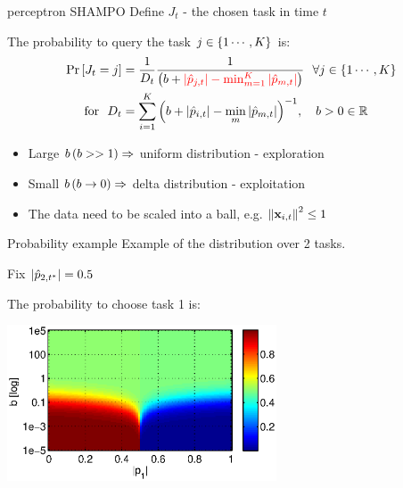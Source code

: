 \documentclass{beamer}
\begin{document}
\begin{frame}{perceptron SHAMPO }
Define $J_t$ - the chosen task in time $t$\newline

The probability to query the task $j\in\left\{{1\cdots,K}\right\}$ is:\newline
\begin{equation*}
\begin{aligned}
 {\rm Pr}\left[{J_t=j}\right]&=\frac{1}{D_t}\frac{1}{\left({b+\textcolor{red}{\left\vert{\hat{p}_{j,t}}\right\vert-\min_{m=1}^K\left\vert{\hat{p}_{m,t}}\right\vert}}\right)} ~~\forall j\in\left\{{1\cdots,K}\right\}\\
~ \textrm{ for }~
D_{t}&=\sum_{i=1}^{K}{\left({b+\left\vert{\hat{p}_{i,t}}\right\vert-\min_{m}\left\vert{\hat{p}_{m,t}}\right\vert}\right)^{-1}},~~~  b>0\in\mathbb{R}
\end{aligned}
\end{equation*}
\begin{itemize}
\item Large $b \left({b >> 1}\right)\Rightarrow$ uniform distribution - exploration \newline
\item Small $b\left({b\rightarrow 0 }\right) \Rightarrow$ delta distribution - exploitation\newline
\item The data need to be  scaled into a ball, e.g. $\left\Vert {\mathbf{x}_{i,t}} \right\Vert^2\le1$ 
\end{itemize}
\end{frame}

\begin{frame}{ Probability example}
Example of the distribution over 2 tasks.\newline

Fix $\left\vert{\hat{p}_{2,t^*}}\right\vert=0.5$\newline

The probability to choose task 1 is:
\begin{center}
\includegraphics[width=0.60\textwidth]{figs/probability.eps}
\end{center}
\end{frame}
\end{document}
